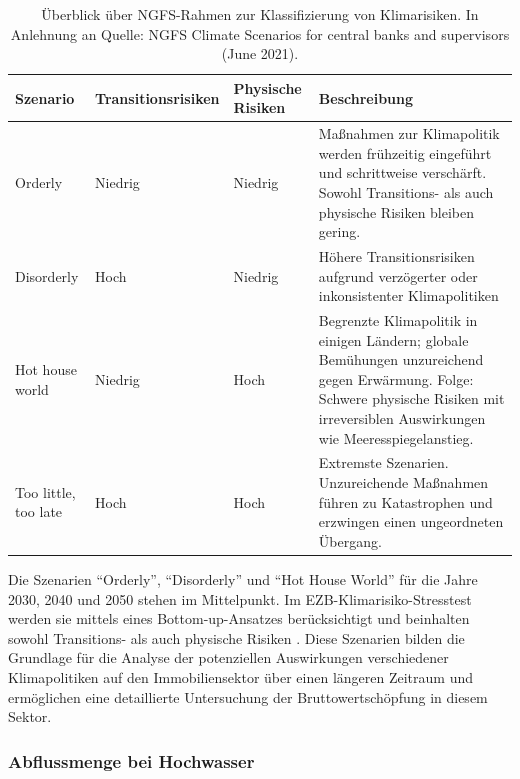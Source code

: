 \begin{table}[htbp]
    \centering
    \small
    \caption{Überblick über NGFS-Rahmen zur Klassifizierung von Klimarisiken. In Anlehnung an Quelle: NGFS Climate Scenarios for central banks and supervisors (June 2021).}
    \label{tab:ngfs-framework}
    \begin{tabularx}{1.0\textwidth}{>{\raggedright\arraybackslash}X >{\centering\arraybackslash}X >{\centering\arraybackslash}X >{\raggedright\arraybackslash}X}
        \toprule
        \textbf{Szenario} & \textbf{Transitionsrisiken} & \textbf{Physische Risiken} & \textbf{Beschreibung} \\
        \midrule
        Orderly & Niedrig & Niedrig & Maßnahmen zur Klimapolitik werden frühzeitig eingeführt und schrittweise verschärft. Sowohl Transitions- als auch physische Risiken bleiben gering. \\
        \addlinespace
        Disorderly & Hoch & Niedrig & Höhere Transitionsrisiken aufgrund verzögerter oder inkonsistenter Klimapolitiken \\
        \addlinespace
        Hot house world & Niedrig & Hoch & Begrenzte Klimapolitik in einigen Ländern; globale Bemühungen unzureichend gegen Erwärmung. Folge: Schwere physische Risiken mit irreversiblen Auswirkungen wie Meeresspiegelanstieg.\\
        \addlinespace
        Too little, too late & Hoch & Hoch & Extremste Szenarien. Unzureichende Maßnahmen führen zu Katastrophen und erzwingen einen ungeordneten Übergang. \\
        \bottomrule
    \end{tabularx}
\end{table}
\FloatBarrier

Die Szenarien "`Orderly"', "`Disorderly"' und "`Hot House World"' für die Jahre 2030, 2040 und 2050 stehen im Mittelpunkt. Im EZB-Klimarisiko-Stresstest werden sie mittels eines Bottom-up-Ansatzes berücksichtigt und beinhalten sowohl Transitions- als auch physische
Risiken \parencite{ECB2022ClimateStressTest}. Diese Szenarien bilden die Grundlage für die Analyse der potenziellen Auswirkungen verschiedener Klimapolitiken auf den Immobiliensektor über einen längeren Zeitraum und ermöglichen eine detaillierte Untersuchung der Bruttowertschöpfung in diesem Sektor.

\subsubsection{Abflussmenge bei Hochwasser}\label{sec:HQ}

